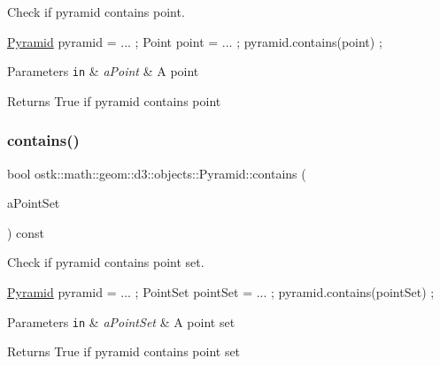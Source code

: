 Check if pyramid contains point. 


\begin{DoxyCode}
\hyperlink{classostk_1_1math_1_1geom_1_1d3_1_1objects_1_1_pyramid_a5560d123994714b36d4737b358dadcea}{Pyramid} pyramid = ... ;
Point point = ... ;
pyramid.contains(point) ;
\end{DoxyCode}



\begin{DoxyParams}[1]{Parameters}
\mbox{\tt in}  & {\em a\+Point} & A point \\
\hline
\end{DoxyParams}
\begin{DoxyReturn}{Returns}
True if pyramid contains point 
\end{DoxyReturn}
\mbox{\label{classostk_1_1math_1_1geom_1_1d3_1_1objects_1_1_pyramid_a4eebfb0cbd8d60ffce7db9b61b550e63}} 
\subsubsection{\texorpdfstring{contains()}{contains()}\hspace{0.1cm}{\footnotesize\ttfamily [2/4]}}
{\footnotesize\ttfamily bool ostk\+::math\+::geom\+::d3\+::objects\+::\+Pyramid\+::contains (\begin{DoxyParamCaption}\item[{const \hyperlink{classostk_1_1math_1_1geom_1_1d3_1_1objects_1_1_point_set}{Point\+Set} \&}]{a\+Point\+Set }\end{DoxyParamCaption}) const}



Check if pyramid contains point set. 


\begin{DoxyCode}
\hyperlink{classostk_1_1math_1_1geom_1_1d3_1_1objects_1_1_pyramid_a5560d123994714b36d4737b358dadcea}{Pyramid} pyramid = ... ;
PointSet pointSet = ... ;
pyramid.contains(pointSet) ;
\end{DoxyCode}



\begin{DoxyParams}[1]{Parameters}
\mbox{\tt in}  & {\em a\+Point\+Set} & A point set \\
\hline
\end{DoxyParams}
\begin{DoxyReturn}{Returns}
True if pyramid contains point set 
\end{DoxyReturn}
\mbox{\label{classostk_1_1math_1_1geom_1_1d3_1_1objects_1_1_pyramid_a7c7d10a2e8fb4a1b23a3b55a5156e588}} 
